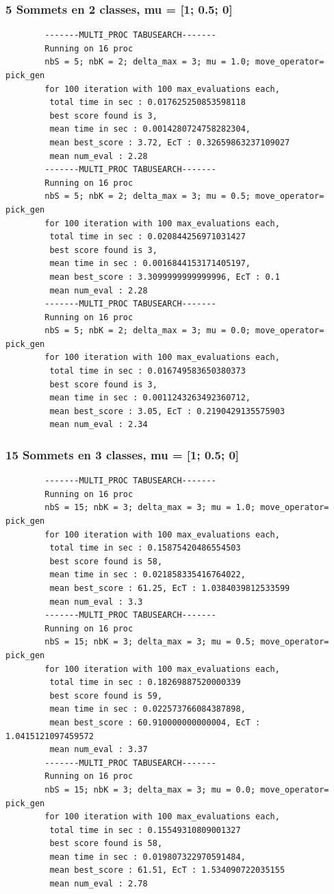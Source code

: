 \documentclass[a4paper]{article}
\begin{document}
		\subsubsection{5 Sommets en 2 classes, mu = [1; 0.5; 0]}
		\begin{verbatim}
		-------MULTI_PROC TABUSEARCH-------
		Running on 16 proc
		nbS = 5; nbK = 2; delta_max = 3; mu = 1.0; move_operator= pick_gen
		for 100 iteration with 100 max_evaluations each, 
		 total time in sec : 0.017625250853598118
		 best score found is 3,
		 mean time in sec : 0.0014280724758282304,
		 mean best_score : 3.72, EcT : 0.32659863237109027
		 mean num_eval : 2.28
		-------MULTI_PROC TABUSEARCH-------
		Running on 16 proc
		nbS = 5; nbK = 2; delta_max = 3; mu = 0.5; move_operator= pick_gen
		for 100 iteration with 100 max_evaluations each, 
		 total time in sec : 0.020844256971031427
		 best score found is 3,
		 mean time in sec : 0.0016844153171405197,
		 mean best_score : 3.3099999999999996, EcT : 0.1
		 mean num_eval : 2.28
		-------MULTI_PROC TABUSEARCH-------
		Running on 16 proc
		nbS = 5; nbK = 2; delta_max = 3; mu = 0.0; move_operator= pick_gen
		for 100 iteration with 100 max_evaluations each, 
		 total time in sec : 0.016749583650380373
		 best score found is 3,
		 mean time in sec : 0.0011243263492360712,
		 mean best_score : 3.05, EcT : 0.2190429135575903
		 mean num_eval : 2.34
		\end{verbatim}
		\subsubsection{15 Sommets en 3 classes, mu = [1; 0.5; 0]}
		\begin{verbatim}
		-------MULTI_PROC TABUSEARCH-------
		Running on 16 proc
		nbS = 15; nbK = 3; delta_max = 3; mu = 1.0; move_operator= pick_gen
		for 100 iteration with 100 max_evaluations each, 
		 total time in sec : 0.15875420486554503
		 best score found is 58,
		 mean time in sec : 0.021858335416764022,
		 mean best_score : 61.25, EcT : 1.0384039812533599
		 mean num_eval : 3.3
		-------MULTI_PROC TABUSEARCH-------
		Running on 16 proc
		nbS = 15; nbK = 3; delta_max = 3; mu = 0.5; move_operator= pick_gen
		for 100 iteration with 100 max_evaluations each, 
		 total time in sec : 0.18269887520000339
		 best score found is 59,
		 mean time in sec : 0.022573766084387898,
		 mean best_score : 60.910000000000004, EcT : 1.0415121097459572
		 mean num_eval : 3.37
		-------MULTI_PROC TABUSEARCH-------
		Running on 16 proc
		nbS = 15; nbK = 3; delta_max = 3; mu = 0.0; move_operator= pick_gen
		for 100 iteration with 100 max_evaluations each, 
		 total time in sec : 0.15549310809001327
		 best score found is 58,
		 mean time in sec : 0.019807322970591484,
		 mean best_score : 61.51, EcT : 1.534090722035155
		 mean num_eval : 2.78
		\end{verbatim}
\end{document}
